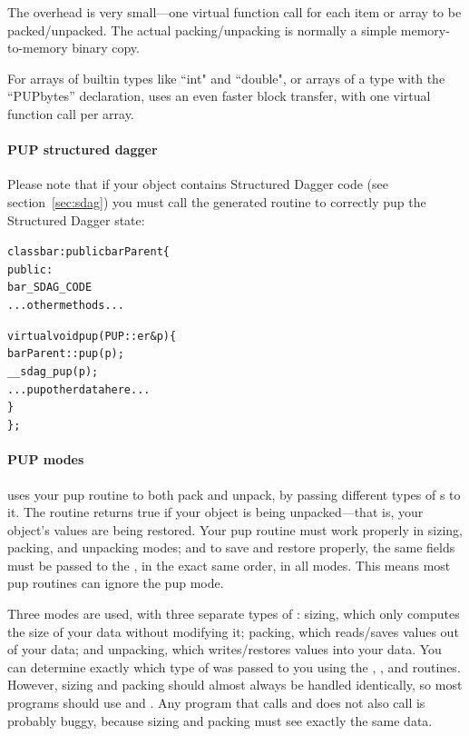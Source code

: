 \label{sec:pupoverhead}

The  overhead is very small---one virtual function call
for each item or array to be packed/unpacked.  The actual packing/unpacking is
normally a simple memory-to-memory binary copy. 

For arrays of builtin types like ``int" and ``double", or arrays of a type 
with the ``PUPbytes'' declaration,  uses an even faster block 
transfer, with one virtual function call per array.


\paragraph{PUP structured dagger}

\label{sec:pupsdag}

Please note that if your object contains Structured Dagger code (see section~\ref{sec:sdag}) you must call the generated routine  to correctly pup the Structured Dagger state:

\begin{alltt}
class bar : public barParent \{
 public:
    bar_SDAG_CODE 
    ...other methods...

    virtual void pup(PUP::er& p) \{
      barParent::pup(p);
      __sdag_pup(p);
      ...pup other data here...
    \}
\};
\end{alltt}



\paragraph{PUP modes}

\label{sec:pupmodes}

\charmpp{} uses your pup routine to both pack and unpack, 
by passing different types of s to it.  The routine
 returns true if your object is being unpacked---that 
is, your object's values are being restored.  Your pup routine must
work properly in sizing, packing, and unpacking modes; and
to save and restore properly, the same fields must be passed 
to the , in the exact same order, in all modes.
This means most pup routines can ignore the pup mode.

Three modes are used, with three separate types of : 
sizing, which only computes the size of your data without modifying it;
packing, which reads/saves values out of your data; and unpacking,
which writes/restores values into your data.  You can determine
exactly which type of  was passed to you using the
, , and 
routines. However, sizing and packing should almost always be 
handled identically, so most programs should use 
and .  Any program that calls  
and does not also call  is probably buggy, because
sizing and packing must see exactly the same data.


